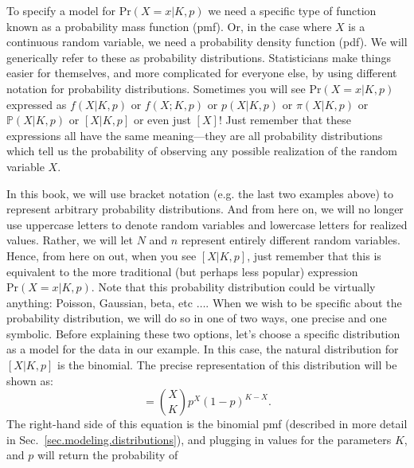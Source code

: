 To specify a model for $\text{Pr}(X=x|K,p)$ we need a specific type of
function known as a probability mass function (pmf). Or, in the case
where $X$ is a continuous random variable, we need a probability density function
(pdf). We will generically refer to these as probability distributions.
Statisticians make things easier for themselves,
and more complicated for everyone else, by using different notation
for probability distributions. Sometimes you will see
$\text{Pr}(X=x|K,p)$ expressed as $f(X|K,p)$ or $f(X; K,p)$ or
$p(X|K,p)$ or $\pi(X|K,p)$ or $\mathbb{P}(X|K,p)$ or $[X|K,p]$ or even
just $[X]$! Just remember that these expressions all have the same
meaning---they are all probability distributions which tell us the
probability of observing any possible realization of the random
variable $X$.

In this book, we will use bracket notation (e.g. the last two
examples above) to represent arbitrary probability distributions.
And from here on, we will no longer use uppercase letters to denote
random variables and lowercase letters for realized values. %
Rather, we will let $N$ and $n$ represent entirely different random
variables.
Hence, from here on out, when you see $[X|K,p]$, just remember that
this is equivalent to the more traditional (but perhaps less popular)
expression $\text{Pr}(X=x|K,p)$. Note that this probability distribution
could be virtually anything: Poisson, Gaussian, beta, etc $\dots$. When
we wish to be specific about the probability distribution, we will do
so in one of two ways, one precise and one symbolic. Before explaining
these two options, let's choose a specific distribution as a model for
the data in our example. In this case, the natural distribution for
$[X|K,p]$ is the binomial. The precise representation of this
distribution will be shown as:
\begin{equation}
  [X|K,p] = %
             \binom{X}{K}p^X(1-p)^{K-X}.
  \label{modeling.eq.bin}
\end{equation}
The right-hand side of this equation is the binomial pmf (described in
more detail in Sec.~\ref{sec.modeling.distributions}), and plugging in
values for the parameters $K$, and $p$ will return the probability of
